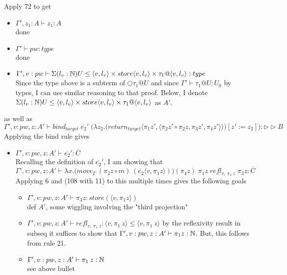 \documentclass{article}
\begin{document}
\begin{itemize}
\begin{itemize}
Apply 72 to get
\begin{itemize}
    \item $\Gamma', z_1: A \vdash z_1 : A$\\
done
    \item $\Gamma' \vdash pw: type$\\
    done
    \item $\Gamma', v: pw \vdash \Sigma(l_v : \mathbb{N})U \leq \langle v, l_v\rangle \times store\langle v, l_v\rangle \times \tau_1@\langle v, l_v\rangle : type$\\
    Since the type above is a subterm of $\bigcirc \tau_1 @ U$ and since $\Gamma' \vdash \tau_1 @ U : U_0$ by types, I can use similar reasoning to that proof. Below, I denote
 $\Sigma(l_v : \mathbb{N})U \leq \langle v, l_v\rangle \times store\langle v, l_v\rangle \times \tau_1@\langle v, l_v\rangle$ as $A'$.
 \end{itemize}
as well as \[\Gamma', v: pw, z:A'  \vdash  bind_{target} \; \overline{e_2}'
\; \big(\lambda z_2. \big(return_{target}\langle \pi_1 z', \langle \pi_2 z' \circ \pi_2 z, \pi_3 z', \pi_4 z' \rangle \rangle \big)[z' := z_2]\big) : \rhd \rhd B\]
Applying the bind rule gives 
\begin{itemize}
    \item $\Gamma', v: pw, z:A'  \vdash \overline{e_2}' : \overline{C}$\\
    Recalling the definition of $\overline{e_2}'$, I am showing that 
    \[\Gamma', v: pw, z:A'  \vdash  \lambda x. \big(move_{\Gamma} \: (\pi_2 z \circ m) \: (\overline{e_2}\langle v,  \pi_1 z \rangle) \big) (\pi_4 z) \; \pi_1 z \; refl_{v, \: \pi_1 \: z} \; \pi_3 z : \overline{C}\]
    Applying 6 and (108 with 11) to this multiple times gives the following goals 
    \begin{itemize}
        \item $\Gamma', v: pw, z:A'  \vdash \pi_3 z : store(\langle v, \pi_1 z \rangle)$\\
        def $A'$, some wiggling involving the "third projection"
        \item $\Gamma', v: pw, z:A'  \vdash refl_{v, \: \pi_1 \: z} : \langle v, \pi_1 \: z \rangle \leq \langle v, \pi_1 \: z \rangle $
        by the reflexivity result in subseq it suffices to show that $\Gamma', v: pw, z:A' \vdash \pi_1 z : \mathbb{N}$. But, this follows from rule 21.
        \item $\Gamma', v: pw, z:A'  \vdash \pi_1 \: z : \mathbb{N} $\\
        see above bullet
    \end{itemize}

\end{itemize}
\end{itemize}
\end{itemize}
\end{document}
